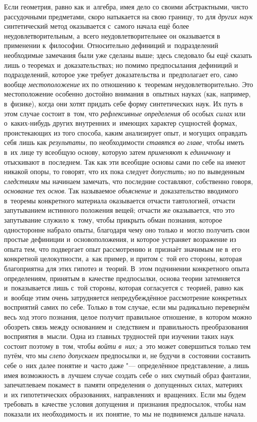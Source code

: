 Если геометрия, равно как и~алгебра, имея дело со своими
абстрактными, чисто рассудочными предметами, скоро натыкается на свою
границу, то для {\em других наук}
синтетический метод оказывается с~самого начала ещё более
неудовлетворительным, а~всего неудовлетворительнее он оказывается в
применении к~философии. Относительно дефиниций и~подразделений необходимые
замечания были уже сделаны выше; здесь следовало бы ещё сказать лишь о
теоремах и~доказательствах; но помимо предпосылания дефиниций и
подразделений, которое уже требует доказательства и~предполагает его, само
вообще {\em местоположение}
их по отношению к~теоремам неудовлетворительно. Это
местоположение особенно достойно внимания в~опытных науках (как, например,
в~физике), когда они хотят придать себе форму синтетических наук. Их путь в
этом случае состоит в~том, что
{\em рефлексивные определения}
об особых {\em силах}
или о~каких-нибудь других внутренних и~имеющих характер
сущностей формах, проистекающих из того способа, каким анализирует опыт, и
могущих оправдать себя лишь как
{\em результаты,} по
необходимости {\em ставятся во главе,}
чтобы иметь в~их лице ту всеобщую основу, которую затем
{\em применяют} к
{\em единичному} и
отыскивают в~последнем. Так как эти всеобщие основы сами по себе на имеют
никакой опоры, то говорят, что их пока следует
{\em допустить;} но по
выведенным {\em следствиям}
мы начинаем замечать, что последние составляют,
собственно говоря,
{\em основание} тех
{\em основ}. Так
называемое {\em объяснение}
и~доказательство вводимого в~теоремы конкретного материала
оказывается отчасти тавтологией, отчасти запутыванием истинного положения
вещей; отчасти же оказывается, что это запутывание служило к~тому, чтобы
прикрыть обман познания, которое односторонне набрало опыты, благодаря чему
оно только и~могло получить свои простые дефиниции и~основоположения, и
которое устраняет возражение из опыта тем, что подвергает опыт рассмотрению
и~признаёт значимым не в~его конкретной целокупности, а~как пример, и
притом с~той его стороны, которая благоприятна для этих гипотез и~теорий.
В~этом подчинении конкретного опыта определениям, принятым в~качестве
предпосылки, основа теории затемняется и~показывается лишь с~той стороны,
которая согласуется с~теорией, равно как и~вообще этим очень затрудняется
непредубеждённое рассмотрение конкретных восприятий самих по себе. Только в
том случае, если мы радикально перевернём весь ход этого познания, целое
получит правильное отношение, в~котором можно обозреть связь между
основанием и~следствием и~правильность преобразования восприятия в~мысли.
Одна из главных трудностей при изучении таких наук состоит поэтому в~том,
чтобы {\em войти в~них;}
а~это может совершиться только тем путём, что мы
{\em слепо допускаем}
предпосылки и, не будучи в~состоянии составить себе о~них
далее понятие и~часто даже "--- определённое представление, а
лишь имея возможность в~лучшем случае создать себе о~них смутный образ
фантазии, запечатлеваем покамест в~памяти определения о~допущенных силах,
материях и~их гипотетических образованиях, направлениях и~вращениях. Если
мы будем требовать в~качестве условия допущения и~признания предпосылок,
чтобы нам показали их необходимость и~их понятие, то мы не подвинемся
дальше начала.

